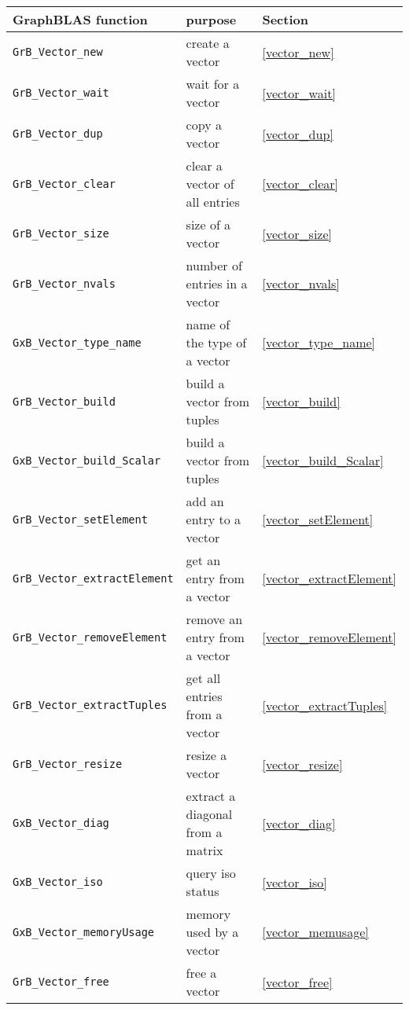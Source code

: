 \documentclass[12pt]{article}
\begin{document}
{\vspace{0.2in}
\noindent
{\footnotesize
\begin{tabular}{lll}
\hline
GraphBLAS function   & purpose                                      & Section \\
\hline
\verb'GrB_Vector_new'            & create a vector                  & \ref{vector_new} \\
\verb'GrB_Vector_wait'           & wait for a vector                & \ref{vector_wait} \\
\verb'GrB_Vector_dup'            & copy a vector                    & \ref{vector_dup} \\
\verb'GrB_Vector_clear'          & clear a vector of all entries    & \ref{vector_clear} \\
\verb'GrB_Vector_size'           & size of a vector                 & \ref{vector_size} \\
\verb'GrB_Vector_nvals'          & number of entries in a vector    & \ref{vector_nvals} \\
\verb'GxB_Vector_type_name'      & name of the type of a vector     & \ref{vector_type_name} \\
\verb'GrB_Vector_build'          & build a vector from tuples       & \ref{vector_build} \\
\verb'GxB_Vector_build_Scalar'   & build a vector from tuples       & \ref{vector_build_Scalar} \\
\verb'GrB_Vector_setElement'     & add an entry to a vector         & \ref{vector_setElement} \\
\verb'GrB_Vector_extractElement' & get an entry from a vector       & \ref{vector_extractElement} \\
\verb'GrB_Vector_removeElement'  & remove an entry from a vector    & \ref{vector_removeElement} \\
\verb'GrB_Vector_extractTuples'  & get all entries from a vector    & \ref{vector_extractTuples} \\
\verb'GrB_Vector_resize'         & resize a vector                  & \ref{vector_resize} \\
\verb'GxB_Vector_diag'           & extract a diagonal from a matrix & \ref{vector_diag} \\
\verb'GxB_Vector_iso'            & query iso status                 & \ref{vector_iso} \\
\verb'GxB_Vector_memoryUsage'    & memory used by a vector          & \ref{vector_memusage} \\
\verb'GrB_Vector_free'           & free a vector                    & \ref{vector_free} \\

\end{tabular}}}
\end{document}
